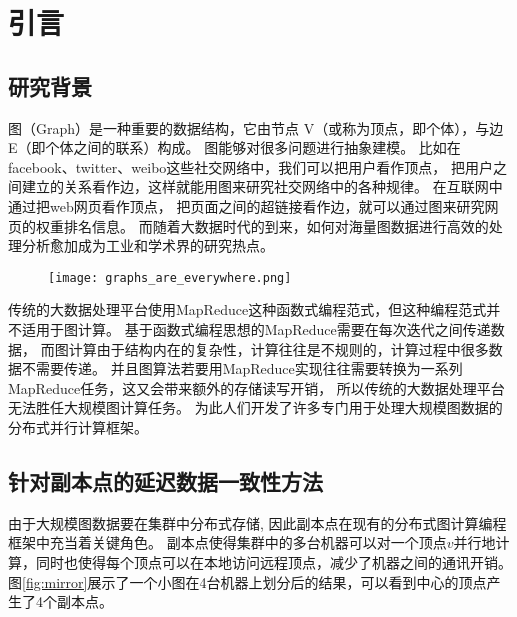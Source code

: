 \chapter{引言}
\section{研究背景}

图（Graph）是一种重要的数据结构，它由节点 V（或称为顶点，即个体），与边 E（即个体之间的联系）构成。
图能够对很多问题进行抽象建模。
比如在facebook、twitter、weibo这些社交网络中，我们可以把用户看作顶点，
把用户之间建立的关系看作边，这样就能用图来研究社交网络中的各种规律。
在互联网中通过把web网页看作顶点，
把页面之间的超链接看作边，就可以通过图来研究网页的权重排名信息。
而随着大数据时代的到来，如何对海量图数据进行高效的处理分析愈加成为工业和学术界的研究热点。

\begin{figure}[!htbp]
  \centering
  \texttt{[image: graphs\_are\_everywhere.png]}
\end{figure}

传统的大数据处理平台使用MapReduce\cite{mapreduce}这种函数式编程范式，但这种编程范式并不适用于图计算。
基于函数式编程思想的MapReduce需要在每次迭代之间传递数据，
而图计算由于结构内在的复杂性，计算往往是不规则的，计算过程中很多数据不需要传递。
并且图算法若要用MapReduce实现往往需要转换为一系列MapReduce任务，这又会带来额外的存储读写开销，
所以传统的大数据处理平台无法胜任大规模图计算任务\cite{Malewicz@SIGMOD10}。
为此人们开发了许多专门用于处理大规模图数据的分布式并行计算框架。    
\cite{Malewicz@SIGMOD10, Low@12, Gonzalez@OSDI12, Zhu@OSDI16, Gonzalez@OSDI14, Avery@HS11, Shao@SIGMOD13, 
Chen@EuroSys15, Xie@PPoPP15, Roy@SOSP15, Seo@CloudCom10, Gregor@POOSC15, Hoque@TRIOS13, Teixeira@SOSP15}

\section{针对副本点的延迟数据一致性方法}

由于大规模图数据要在集群中分布式存储, 因此副本点在现有的分布式图计算编程框架中充当着关键角色。
副本点使得集群中的多台机器可以对一个顶点$v$并行地计算，同时也使得每个顶点可以在本地访问远程顶点，减少了机器之间的通讯开销。 
图\ref{fig:mirror}展示了一个小图在4台机器上划分后的结果，可以看到中心的顶点产生了4个副本点。

